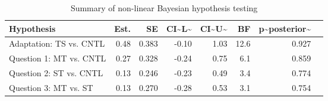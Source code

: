 \begin{table}

\caption{\label{tab:unnamed-chunk-27}Summary of non-linear Bayesian hypothesis testing}
\centering
\begin{tabular}[t]{l|r|r|r|r|r|r|l}
\hline
Hypothesis & Est. & SE & CI\textasciitilde{}L\textasciitilde{} & CI\textasciitilde{}U\textasciitilde{} & BF & p\textasciitilde{}posterior\textasciitilde{} & \\
\hline
Adaptation: TS vs. CNTL & 0.48 & 0.383 & -0.10 & 1.03 & 12.6 & 0.927 & \\
\hline
Question 1: MT vs. CNTL & 0.27 & 0.328 & -0.24 & 0.75 & 6.1 & 0.859 & \\
\hline
Question 2: ST vs. CNTL & 0.13 & 0.246 & -0.23 & 0.49 & 3.4 & 0.774 & \\
\hline
Question 3: MT vs. ST & 0.13 & 0.270 & -0.28 & 0.53 & 3.1 & 0.754 & \\
\hline
\end{tabular}
\end{table}
